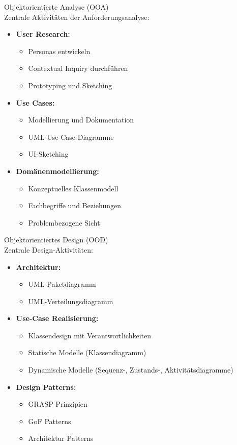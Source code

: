 \begin{concept}{Objektorientierte Analyse (OOA)}\\
Zentrale Aktivitäten der Anforderungsanalyse:
\begin{itemize}
    \item \textbf{User Research:}
    \begin{itemize}
        \item Personas entwickeln
        \item Contextual Inquiry durchführen
        \item Prototyping und Sketching
    \end{itemize}
    \item \textbf{Use Cases:}
    \begin{itemize}
        \item Modellierung und Dokumentation
        \item UML-Use-Case-Diagramme
        \item UI-Sketching
    \end{itemize}
    \item \textbf{Domänenmodellierung:}
    \begin{itemize}
        \item Konzeptuelles Klassenmodell
        \item Fachbegriffe und Beziehungen
        \item Problembezogene Sicht
    \end{itemize}
\end{itemize}
\end{concept}

\begin{concept}{Objektorientiertes Design (OOD)}\\
Zentrale Design-Aktivitäten:
\begin{itemize}
    \item \textbf{Architektur:}
    \begin{itemize}
        \item UML-Paketdiagramm
        \item UML-Verteilungsdiagramm
    \end{itemize}
    \item \textbf{Use-Case Realisierung:}
    \begin{itemize}
        \item Klassendesign mit Verantwortlichkeiten
        \item Statische Modelle (Klassendiagramm)
        \item Dynamische Modelle (Sequenz-, Zustands-, Aktivitätsdiagramme)
    \end{itemize}
    \item \textbf{Design Patterns:}
    \begin{itemize}
        \item GRASP Prinzipien
        \item GoF Patterns
        \item Architektur Patterns
    \end{itemize}
\end{itemize}
\end{concept}

